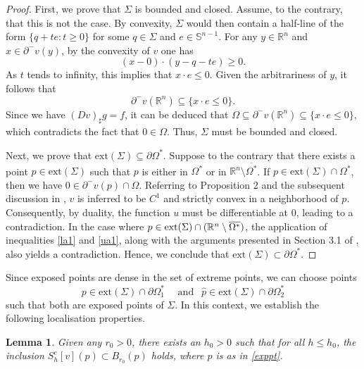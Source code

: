 \documentclass[11pt]{amsart}
\theoremstyle{plain}
\newtheorem{lemma}{Lemma}[section]
\newcommand{\0}{\textbf{0}}
\numberwithin{equation}{section}
\numberwithin{equation}{section}
\numberwithin{figure}{section}
\begin{document}
\begin{proof}
First, we prove that $\Sigma$ is bounded and closed. Assume, to the contrary, that this is not the case. 
By convexity, $\Sigma$ would then contain a half-line of the form $\{q + te : t \geq 0\}$ for some $q \in \Sigma$ and $e \in \mathbb{S}^{n-1}$. For any $y \in \mathbb{R}^n$ and $x \in \partial^{-}v(y)$, by the convexity of $v$ one has 
	$$ (x - 0) \cdot (y - q - te) \geq 0. $$ 
As $t$ tends to infinity, this implies that $x \cdot e \leq 0$. 
Given the arbitrariness of $y$, it follows that 
	$$\partial^{-} v(\mathbb{R}^n) \subseteq \{x \cdot e \leq 0\}.$$ 
Since we have $(Dv)_{\sharp}g = f$, it can be deduced that $\Omega \subseteq \partial^{-} v(\mathbb{R}^n) \subseteq \{x \cdot e \leq 0\},$ which contradicts the fact that $0 \in \Omega$. Thus, $\Sigma$ must be bounded and closed.

Next, we prove that $\text{ext}(\Sigma) \subseteq \partial\Omega^*$. Suppose to the contrary that there exists a point $p \in \text{ext}(\Sigma)$ such that $p$ is either in $\Omega^*$ or in $\mathbb{R}^n \setminus \overline{\Omega^*}$. If $p \in \text{ext}(\Sigma) \cap \Omega^*$, then we have $0 \in \partial^{-}v(p) \cap \Omega$. Referring to Proposition 2 and the subsequent discussion in \cite{FK1}, $v$ is inferred to be $C^1$ and strictly convex in a neighborhood of $p$. Consequently, by duality, the function $u$ must be differentiable at $0$, leading to a contradiction. In the case where $p \in \text{\normalfont ext}(\Sigma) \cap (\mathbb{R}^n \setminus \overline{\Omega^*})$, the application of inequalities \eqref{la1} and \eqref{ua1}, along with the arguments presented in Section 3.1 of \cite{FK1}, also yields a contradiction. Hence, we conclude that $\text{ext}(\Sigma) \subset \partial\Omega^*$.
\end{proof}




Since exposed points are dense in the set of extreme points, we can choose points 
	\begin{equation}\label{exppt}
		p\in\text{ext}(\Sigma) \cap \partial\Omega^*_1 \quad \text{ and }\ \  \hat{p} \in  \text{ext}(\Sigma) \cap \partial\Omega^*_2
	\end{equation} 
 such that both are exposed points of \( \Sigma \). In this context, we establish the following localisation properties.

\begin{lemma}\label{locc1}
Given any \( r_0 > 0 \), there exists an \( h_0 > 0 \) such that for all \( h \leq h_0 \), the inclusion \( S^c_h[v](p) \subset B_{r_0}(p) \) holds,  where $p$ is as in \eqref{exppt}. 
\end{lemma}
\end{document}
